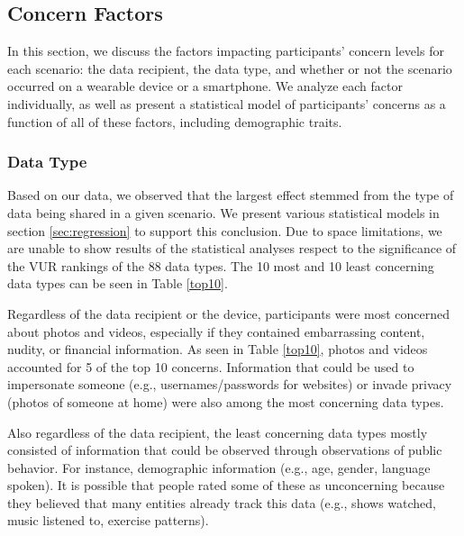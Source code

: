 \documentclass{acm_proc_article-sp}
\begin{document}
\subsection{Concern Factors}
In this section, we discuss the factors impacting participants' concern levels for each scenario: the data recipient, the data type, and whether or not the scenario occurred on a wearable device or a smartphone. We analyze each factor individually, as well as present a statistical model of participants' concerns as a function of all of these factors, including demographic traits.

\subsubsection{Data Type}
Based on our data, we observed that the largest effect stemmed from the type of data being shared in a given scenario. We present various statistical models in section \ref{sec:regression} to support this conclusion. Due to space limitations, we are unable to show results of the statistical analyses respect to the significance of the VUR rankings of the 88 data types. The 10 most and 10 least concerning data types can be seen in Table \ref{top10}. 

Regardless of the data recipient or the device, participants were most concerned about photos and videos, especially if they contained embarrassing content, nudity, or financial information. As seen in Table \ref{top10}, photos and videos accounted for 5 of the top 10 concerns. Information that could be used to impersonate someone (e.g., usernames/passwords for websites) or invade privacy (photos of someone at home) were also among the most concerning data types. 

Also regardless of the data recipient, the least concerning data types mostly consisted of information that could be observed through observations of public behavior. For instance, demographic information (e.g., age, gender, language spoken). It is possible that people rated some of these as unconcerning because they believed that many entities already track this data (e.g., shows watched, music listened to, exercise patterns).
\end{document}
